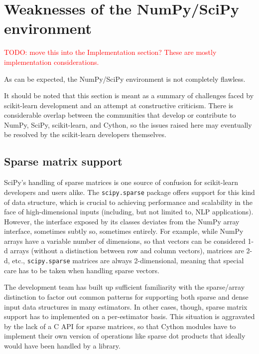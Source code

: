 \documentclass{llncs}
\begin{document}
\section{Weaknesses of the NumPy/SciPy environment}

\label{sec:weaknesses}

\textcolor{red}{TODO: move this into the Implementation section? These are mostly implementation considerations.}

As can be expected, the NumPy/SciPy environment is not completely flawless.

It should be noted that this section is meant
as a summary of challenges faced by scikit-learn development
and an attempt at constructive criticism.
There is considerable overlap between the communities
that develop or contribute to NumPy, SciPy, scikit-learn, and Cython,
so the issues raised here may eventually be resolved
by the scikit-learn developers themselves.

\subsection{Sparse matrix support}

SciPy's handling of sparse matrices is one source of confusion
for scikit-learn developers and users alike.
The \texttt{scipy.sparse} package offers support
for this kind of data structure,
which is crucial to achieving performance and scalability
in the face of high-dimensional inputs
(including, but not limited to, NLP applications).
However, the interface exposed by its classes
deviates from the NumPy array interface, sometimes subtly so,
sometimes entirely.  %
For example, while NumPy arrays have a variable number of dimensions,
so that vectors can be considered 1-d arrays
(without a distinction between row and column vectors),
matrices are 2-d, etc., \texttt{scipy.sparse} matrices are always 2-dimensional,
meaning that special care has to be taken when handling sparse vectors.

The development team has built up sufficient familiarity
with the sparse/array distinction to factor out common patterns
for supporting both sparse and dense input data structures in many estimators.
In other cases, though, sparse matrix support has to implemented
on a per-estimator basis.
This situation is aggravated by the lack of a C API for sparse matrices,
so that Cython modules have to implement their own version
of operations like sparse dot products
that ideally would have been handled by a library.
\end{document}
